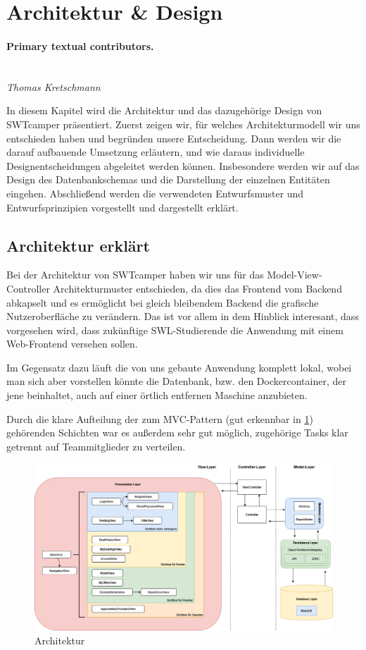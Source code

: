 \section{Architektur \& Design}
\label{sec:architecture_design}

\paragraph{Primary textual contributors.}
\mbox{}\\\emph{Thomas Kretschmann}

In diesem Kapitel wird die Architektur und das dazugehörige Design von SWTcamper präsentiert. Zuerst zeigen wir, für welches Architekturmodell wir uns entschieden haben und begründen unsere Entscheidung. Dann werden wir die darauf aufbauende Umsetzung erläutern, und wie daraus individuelle Designentscheidungen abgeleitet werden können. Insbesondere werden wir auf das Design des Datenbankschemas und die Darstellung der einzelnen Entitäten eingehen. Abschließend werden die verwendeten Entwurfsmuster und Entwurfsprinzipien vorgestellt und dargestellt
erklärt.


\subsection{Architektur erklärt}
Bei der Architektur von SWTcamper haben wir uns für das Model-View-Controller Architekturmuster entschieden, da dies das Frontend vom Backend abkapselt und es ermöglicht bei gleich bleibendem Backend die grafische Nutzeroberfläche zu verändern. Das ist vor allem in dem Hinblick interesant, dass vorgesehen wird, dass zukünftige SWL-Studierende die Anwendung mit einem Web-Frontend versehen sollen.

Im Gegensatz dazu läuft die von uns gebaute Anwendung komplett lokal, wobei man sich aber vorstellen könnte die Datenbank, bzw. den Dockercontainer, der jene beinhaltet, auch auf einer örtlich entfernen Maschine anzubieten.

Durch die klare Aufteilung der zum MVC-Pattern (gut erkennbar in \ref{fig:architecture}) gehörenden Schichten war es außerdem sehr gut möglich, zugehörige Tasks klar getrennt auf Teammitglieder zu verteilen.

\begin{figure}[h]
	\centering
	\includegraphics[width=12cm]{resources/images/architecture.drawio.png}
	\caption{Architektur}
	\label{fig:architecture}
\end{figure}

